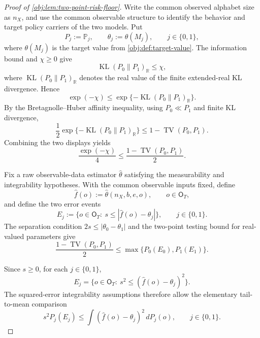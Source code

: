 \begin{proof}[Proof of \cref{obj:lem:two-point-risk-floor}]
Write the common observed alphabet size as \(n_X\), and use the common observable
structure to identify the behavior and target policy carriers of the two models.  Put
\[
P_j:=\mathbb P_j,\qquad
\theta_j:=\theta(M_j),\qquad j\in\{0,1\},
\]
where \(\theta(M_j)\) is the target value from \cref{obj:def:target-value}.  The
information bound and \(\chi\ge0\) give
\[
\operatorname{KL}(P_0\|P_1)_{\mathbb R}\le \chi ,
\]
where \(\operatorname{KL}(P_0\|P_1)_{\mathbb R}\) denotes the real value of the
finite extended-real KL divergence.  Hence
\[
\exp(-\chi)
\le
\exp\{-\operatorname{KL}(P_0\|P_1)_{\mathbb R}\}.
\]
By the Bretagnolle--Huber affinity inequality, using \(P_0\ll P_1\) and finite
KL divergence,
\[
\frac12\exp\{-\operatorname{KL}(P_0\|P_1)_{\mathbb R}\}
\le
1-\operatorname{TV}(P_0,P_1).
\]
Combining the two displays yields
\begin{equation}\label{eq:two-point-risk-floor-affinity}
\frac{\exp(-\chi)}{4}
\le
\frac{1-\operatorname{TV}(P_0,P_1)}{2}.
\end{equation} %

Fix a raw observable-data estimator \(\widehat\theta\) satisfying the measurability
and integrability hypotheses.  With the common observable inputs fixed, define
\[
\widehat f(o):=\widehat\theta(n_X,b,e,o),
\qquad o\in\mathsf O_T,
\]
and define the two error events
\[
E_j:=\{o\in\mathsf O_T:\ s\le |\widehat f(o)-\theta_j|\},
\qquad j\in\{0,1\}.
\]
The separation condition \(2s\le|\theta_0-\theta_1|\) and the two-point testing
bound for real-valued parameters give
\begin{equation}\label{eq:two-point-risk-floor-testing}
\frac{1-\operatorname{TV}(P_0,P_1)}{2}
\le
\max\{P_0(E_0),P_1(E_1)\}.
\end{equation} %

Since \(s\ge0\), for each \(j\in\{0,1\}\),
\[
E_j
=
\{o\in\mathsf O_T:\ s^2\le(\widehat f(o)-\theta_j)^2\}.
\]
The squared-error integrability assumptions therefore allow the elementary
tail-to-mean comparison
\begin{equation}\label{eq:two-point-risk-floor-tail-mean}
s^2 P_j(E_j)
\le
\int(\widehat f(o)-\theta_j)^2\,dP_j(o),
\qquad j\in\{0,1\}.
\end{equation} %


\end{proof}
